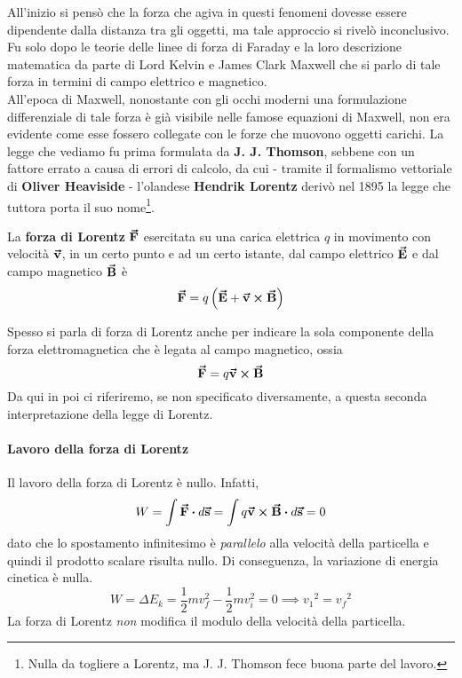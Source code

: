All'inizio si pensò che la forza che agiva in questi fenomeni dovesse essere dipendente dalla distanza tra gli oggetti, ma tale approccio si rivelò inconclusivo. Fu solo dopo le teorie delle linee di forza di Faraday e la loro descrizione matematica da parte di Lord Kelvin e James Clark Maxwell che si parlo di tale forza in termini di campo elettrico e magnetico.\\
All'epoca di Maxwell, nonostante con gli occhi moderni una formulazione differenziale di tale forza è già visibile nelle famose equazioni di Maxwell, non era evidente come esse fossero collegate con le forze che muovono oggetti carichi. La legge che vediamo fu prima formulata da \textbf{J. J. Thomson}, sebbene con un fattore errato a causa di errori di calcolo, da cui - tramite il formalismo vettoriale di \textbf{Oliver Heaviside} - l'olandese \textbf{Hendrik Lorentz} derivò nel 1895 la legge che tuttora porta il suo nome\footnote{Nulla da togliere a Lorentz, ma J. J. Thomson fece buona parte del lavoro.}.
\begin{define}
	La \textbf{forza di Lorentz} $\vb*{\va{F}}$ esercitata su una carica elettrica $q$ in movimento con velocità $\vb*{\va{v}}$, in un certo punto e ad un certo istante, dal campo elettrico $\vb*{\va{E}}$ e dal campo magnetico $\vb*{\va{B}}$ è
	\begin{equation}
		\vb*{\va{F}}=q\left(\vb*{\va{E}}+\vb*{\va{v}}\cross\vb*{\va{B}}\right)
	\end{equation}
\end{define}
Spesso si parla di forza di Lorentz anche per indicare la sola componente della forza elettromagnetica che è legata al campo magnetico, ossia
\begin{equation}
	\vb*{\va{F}}=q\vb*{\va{v}}\cross\vb*{\va{B}}
\end{equation}
Da qui in poi ci riferiremo, se non specificato diversamente, a questa seconda interpretazione della legge di Lorentz.
\paragraph{Lavoro della forza di Lorentz}
Il lavoro della forza di Lorentz è nullo. Infatti,
\begin{equation}
	W=\int \vba{F}\vdot d\vba{s}=\int q\vba{v}\cross\vba{B}\vdot d\vba{s}=0
\end{equation}
dato che lo spostamento infinitesimo è \textit{parallelo} alla velocità della particella e quindi il prodotto scalare risulta nullo. Di conseguenza, la variazione di energia cinetica è nulla.
\begin{equation*}
	W=\Delta E_k=\frac{1}{2}mv_{f}^2-\frac{1}{2}mv_{i}^2=0\implies{v_1}^2={v_f}^2
\end{equation*}
La forza di Lorentz \textit{non} modifica il modulo della velocità della particella.

